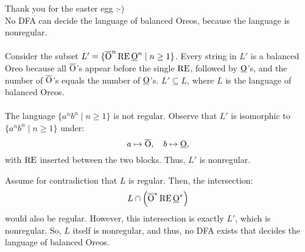 \documentclass[11pt,addpoints,answers]{exam}
\begin{document}
\begin{questions}
    \begin{solution}
      Thank you for the easter egg :-)\\
      No DFA can decide the language of balanced Oreos, because the language is nonregular.\\
      \\
      Consider the subset $L' = \{\overline{\text{O}}^n\,\text{RE}\,\underline{\text{O}}^n \mid n\ge1\}$. Every string in \(L'\) is a balanced Oreo because all \(\overline{\text{O}}\)'s appear before the single \(\text{RE}\), followed by \(\underline{\text{O}}\)'s, and the number of \(\overline{\text{O}}\)'s equals the number of \(\underline{\text{O}}\)'s. \(L' \subseteq L\), where \(L\) is the language of balanced Oreos.\\
      \\
      The language $\{a^n b^n \mid n\ge1\}$ is not regular. Observe that \(L'\) is isomorphic to \(\{a^n b^n \mid n\ge1\}\) under:
      \[
      a\mapsto\overline{\text{O}},\quad b\mapsto\underline{\text{O}},
      \]
      with \(\text{RE}\) inserted between the two blocks. Thus, \(L'\) is nonregular.
      
      Assume for contradiction that \(L\) is regular. Then, the intersection:
      \[
      L \cap \left(\overline{\text{O}}^*\,\text{RE}\,\underline{\text{O}}^*\right)
      \]
      would also be regular. However, this intersection is exactly \(L'\), which is nonregular. So, \(L\) itself is nonregular, and thus, no DFA exists that decides the language of balanced Oreos.
          
    \end{solution}
\end{questions}
\end{document}
